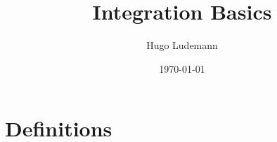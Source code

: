 \documentclass[20pt]{article}
\title{Integration Basics}
\date{\today}
\author{Hugo Ludemann}
\theoremstyle{plain}
\newtheorem{theorem}{Theorem}
\theoremstyle{definition}
\newtheorem{definition}{Definition}
\newcommand{\reals}{\mathbb{R}}
\begin{document}
\maketitle



\section{Definitions}




\end{document}
